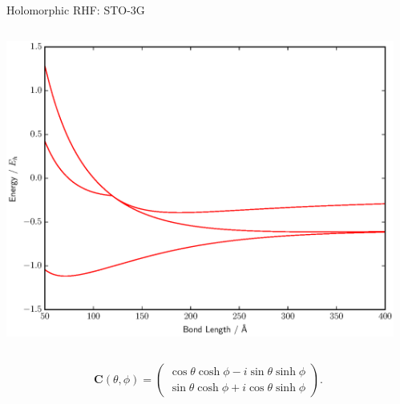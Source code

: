 \documentclass{beamer}
\begin{document}
\begin{frame}{Holomorphic RHF:  STO-3G}
 \begin{columns}
   \begin{column}{0.3\textwidth}
    \includegraphics[scale=0.25]{20161219_ThomGroup_Update/BFGS_RHF_HH_sto-3g}
   \end{column}
   \begin{column}{0.7\textwidth}
     \begin{center}
     \hspace{2em}
     \end{center} 
   \end{column}
 \end{columns}
 {\tiny $$ \mathbf{C}(\theta, \phi) = \left(
  \begin{matrix}
  \cos \theta \cosh \phi - i \sin \theta \sinh \phi \\  
  \sin \theta \cosh \phi  + i \cos \theta \sinh \phi
  \end{matrix} \right). $$}
\end{frame} 
\end{document}
